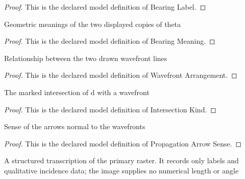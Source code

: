 \begin{proof}
  This is the declared model definition of Bearing Label.
\end{proof}
\begin{definition}
  \label{def:physics:phyx-mini-0308:phyxminiproblems-problemphyxmini0308-bearingmeaning}
  Geometric meanings of the two displayed copies of theta
\end{definition}
\begin{proof}
  This is the declared model definition of Bearing Meaning.
\end{proof}
\begin{definition}
  \label{def:physics:phyx-mini-0308:phyxminiproblems-problemphyxmini0308-wavefrontarrangement}
  Relationship between the two drawn wavefront lines
\end{definition}
\begin{proof}
  This is the declared model definition of Wavefront Arrangement.
\end{proof}
\begin{definition}
  \label{def:physics:phyx-mini-0308:phyxminiproblems-problemphyxmini0308-intersectionkind}
  The marked intersection of d with a wavefront
\end{definition}
\begin{proof}
  This is the declared model definition of Intersection Kind.
\end{proof}
\begin{definition}
  \label{def:physics:phyx-mini-0308:phyxminiproblems-problemphyxmini0308-propagationarrowsense}
  Sense of the arrows normal to the wavefronts
\end{definition}
\begin{proof}
  This is the declared model definition of Propagation Arrow Sense.
\end{proof}
\begin{definition}
  \label{def:physics:phyx-mini-0308:phyxminiproblems-problemphyxmini0308-sourcefigure}
  A structured transcription of the primary raster. It records only labels and qualitative incidence data; the image supplies no numerical length or angle
\end{definition}
